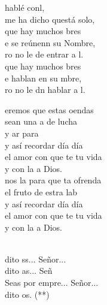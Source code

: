 \documentclass[12pt]{article}
\begin{document}
\begin{multicols*}{2}
\begin{cancion}
             hablé conl,\\
            me ha dicho questá solo,\\
            que hay muchos bres\\
            e se reúnenn su Nombre,\\
            ro no le de entrar a l.\\
            que hay muchos bres\\
            e hablan en su mbre,\\
            ro no le dn hablar a l.\\
        \end{cancion}%
        
        \begin{cancion}%
            eremos que estas oendas \\
            sean una a de lucha \\
            y ar para \\
            y así recordar día día \\
            el amor con que te tu vida \\
            y con la a Dios.\\
        \jump
            nos la  para que ta ofrenda \\
             el fruto de estra lab\\
            y así recordar día día \\
            el amor con que te tu vida\\
            y con la a Dios.\\\jump\\
            \begin{chorus}%
            dito ss... Señor...\\
            dito as... Señ\\
            Seas por empre... Señor...\\
            dito os. (**)\\
            \end{chorus}%
            \jump\\
        \end{cancion}%
        

\end{multicols*}
\end{document}
